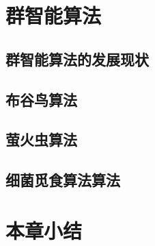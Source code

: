 \section{群智能算法}

  \subsection{群智能算法的发展现状}

  \subsection{布谷鸟算法}

  \subsection{萤火虫算法}

  \subsection{细菌觅食算法算法}

\section{本章小结}